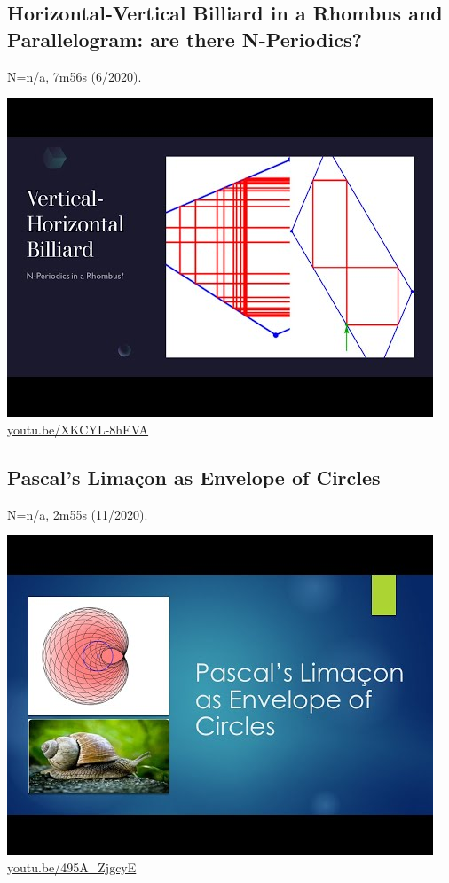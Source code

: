 \documentclass[12pt]{amsart}
\begin{document}
\subsection{Horizontal-Vertical Billiard in a Rhombus and Parallelogram: are there N-Periodics?}
\label{vid:XKCYL-8hEVA}
\noindent N=n/a, 7m56s (6/2020). 
\begin{center}\includegraphics[width=.5\textwidth]{pics/XKCYL-8hEVA.jpg} \\ 
\href{https://youtu.be/XKCYL-8hEVA}{\url{youtu.be/XKCYL-8hEVA}}\end{center}
% 

\subsection{Pascal's Limaçon as Envelope of Circles}
\label{vid:495A_ZjgcyE}
\noindent N=n/a, 2m55s (11/2020). 
\begin{center}\includegraphics[width=.5\textwidth]{pics/495A_ZjgcyE.jpg} \\ 
\href{https://youtu.be/495A_ZjgcyE}{\url{youtu.be/495A\_ZjgcyE}}\end{center}
% 
\end{document}
